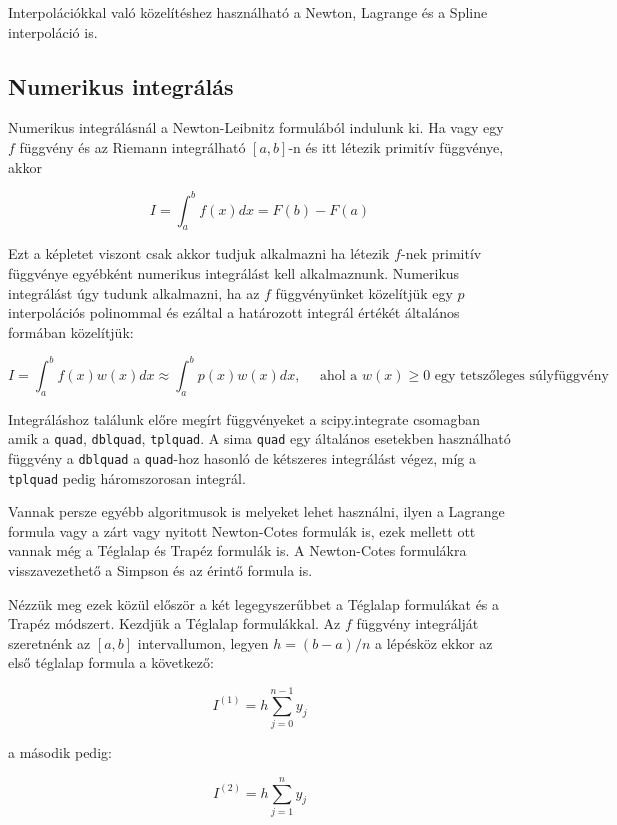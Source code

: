     Interpolációkkal való közelítéshez használható a Newton, Lagrange és a
Spline interpoláció is.

    \subsection{Numerikus integrálás}\label{numerikus-integruxe1luxe1s}

    Numerikus integrálásnál a Newton-Leibnitz formulából indulunk ki. Ha
vagy egy \(f\) függvény és az Riemann integrálható \([a,b]\)-n és itt
létezik primitív függvénye, akkor

\[
I=\int^b_a f(x)dx=F(b)-F(a)
\]

Ezt a képletet viszont csak akkor tudjuk alkalmazni ha létezik \(f\)-nek
primitív függvénye egyébként numerikus integrálást kell alkalmaznunk.
Numerikus integrálást úgy tudunk alkalmazni, ha az \(f\) függvényünket
közelítjük egy \(p\) interpolációs polinommal és ezáltal a határozott
integrál értékét általános formában közelítjük:

\[
I=\int^b_a f(x)w(x)dx \approx \int^b_a p(x)w(x)dx,\quad \textrm{ ahol a $w(x)\geq0$ egy tetszőleges súlyfüggvény}
\]

    Integráláshoz találunk előre megírt függvényeket a scipy.integrate
csomagban amik a \texttt{quad}, \texttt{dblquad}, \texttt{tplquad}. A
sima \texttt{quad} egy általános esetekben használható függvény a
\texttt{dblquad} a \texttt{quad}-hoz hasonló de kétszeres integrálást
végez, míg a \texttt{tplquad} pedig háromszorosan integrál.

\begin{python}

\end{python}

    Vannak persze egyébb algoritmusok is melyeket lehet használni, ilyen a
Lagrange formula vagy a zárt vagy nyitott Newton-Cotes formulák is, ezek
mellett ott vannak még a Téglalap és Trapéz formulák is. A Newton-Cotes
formulákra visszavezethető a Simpson és az érintő formula is.

    Nézzük meg ezek közül először a két legegyszerűbbet a Téglalap
formulákat és a Trapéz módszert. Kezdjük a Téglalap formulákkal. Az
\(f\) függvény integrálját szeretnénk az \([a,b]\) intervallumon, legyen
\(h=(b-a)/n\) a lépésköz ekkor az első téglalap formula a következő:

\[
I^{(1)}= h  \sum^{n-1}_{j=0}y_j
\]

a második pedig:

\[
I^{(2)}= h  \sum^{n}_{j=1}y_j
\]

